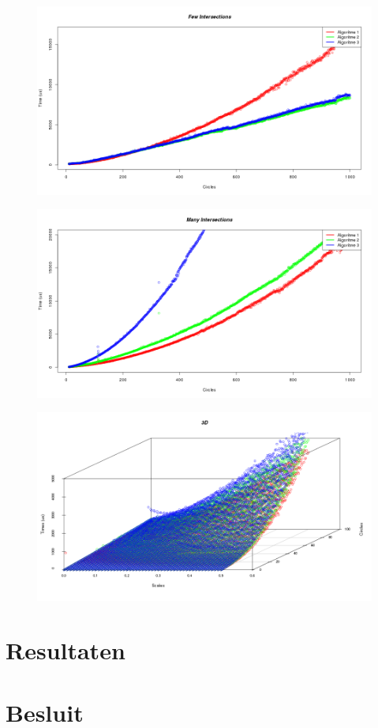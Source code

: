 \documentclass[12pt,a4paper]{article}
\begin{document}
\begin{figure}[H]
  \centering
  \includegraphics[width=1\textwidth]{illustraties/fewIntersections.png}
\end{figure}
\begin{figure}[H]
  \centering
  \includegraphics[width=1\textwidth]{illustraties/manyIntersections.png}
\end{figure}
\begin{figure}[H]
  \centering
  \includegraphics[width=1\textwidth]{illustraties/3DScatter.png}
\end{figure}



\section{Resultaten}

\section{Besluit}

\listoftodos
\end{document}

